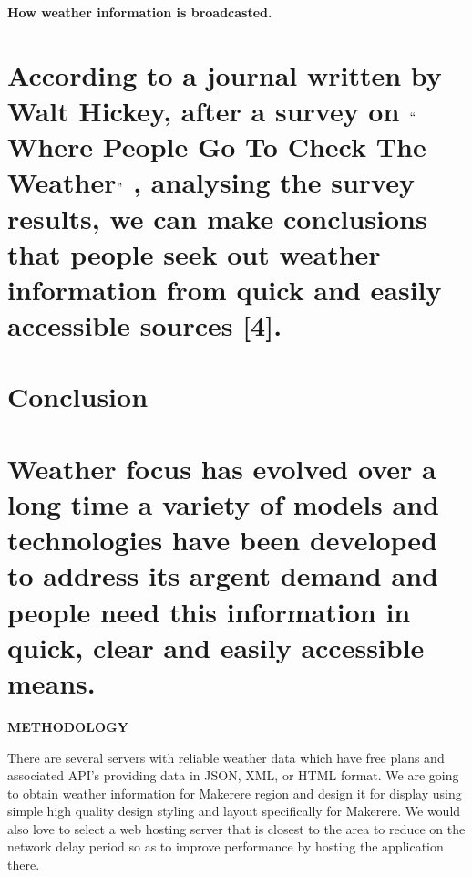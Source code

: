 \documentclass[12pt]{article}
\begin{document}
\vspace{\baselineskip}
{\fontsize{13pt}{15.6pt}\selectfont \textbf{How weather information is broadcasted.}\par}\par

\setlength{\parskip}{4.56pt}
\section*{According to a journal written by Walt Hickey, after a survey on $``$Where People Go To Check The Weather$"$ , analysing the survey results, we can make conclusions that people seek out weather information from quick and easily accessible sources [4]. }

\vspace{\baselineskip}
\section*{Conclusion}
\section*{Weather focus has evolved over a long time a variety of models and technologies have been developed to address its argent demand and people need this information in quick, clear and easily accessible means.}

\vspace{\baselineskip}
\setlength{\parskip}{7.44pt}
{\fontsize{13pt}{15.6pt}\selectfont \textbf{METHODOLOGY}\par}\par

{\fontsize{13pt}{15.6pt}\selectfont There are several servers with reliable weather data which have free plans and associated API’s providing data in JSON, XML, or HTML format. We are going to obtain weather information for Makerere region and design it for display using simple high quality design styling and layout specifically for Makerere. We would also love to select a web hosting server that is closest to the area to reduce on the network delay period so as to improve performance by hosting the application there. \par}\par
\end{document}
